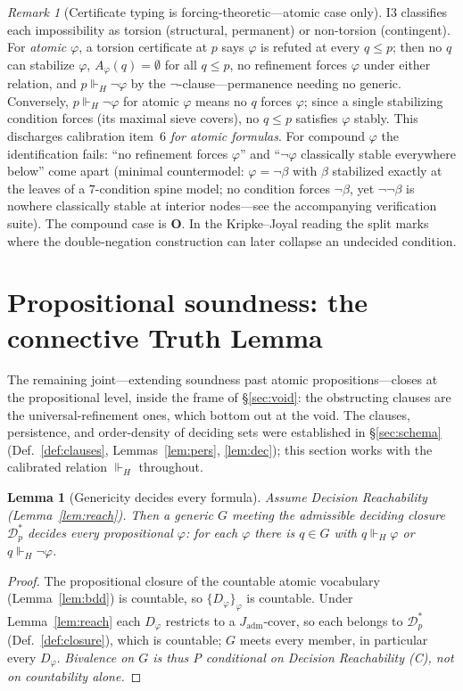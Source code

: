 \documentclass[11pt]{article}
\newtheorem{lemma}{Lemma}
\theoremstyle{definition}
\theoremstyle{remark}
\newtheorem*{remark}{Remark}
\newcommand{\forcesH}{\Vdash_{H}}
\newcommand{\refines}{\leq}
\newcommand{\Jadm}{J_{\mathrm{adm}}}
\begin{document}
\begin{remark}[Certificate typing is forcing-theoretic---atomic case only]\label{rem:torsion}
I3 classifies each impossibility as torsion (structural, permanent) or non-torsion (contingent).
For \emph{atomic} $\varphi$, a torsion certificate at $p$ says $\varphi$ is refuted at every
$q\refines p$; then no $q$ can stabilize $\varphi$, $A_\varphi(q)=\emptyset$ for all $q\refines p$,
no refinement forces $\varphi$ under either relation, and $p\forcesH\neg\varphi$ by the
$\neg$-clause---permanence needing no generic. Conversely, $p\forcesH\neg\varphi$ for atomic
$\varphi$ means no $q$ forces $\varphi$; since a single stabilizing condition forces (its maximal
sieve covers), no $q\refines p$ satisfies $\varphi$ stably. This discharges calibration item~6
\emph{for atomic formulas}. For compound $\varphi$ the identification fails: ``no refinement forces
$\varphi$'' and ``$\neg\varphi$ classically stable everywhere below'' come apart (minimal
countermodel: $\varphi=\neg\beta$ with $\beta$ stabilized exactly at the leaves of a $7$-condition
spine model; no condition forces $\neg\beta$, yet $\neg\neg\beta$ is nowhere classically stable at
interior nodes---see the accompanying verification suite). The compound case is \textbf{O}. In the
Kripke--Joyal reading the split marks where the double-negation construction can later collapse an
undecided condition.
\end{remark}

\section{Propositional soundness: the connective Truth Lemma}\label{sec:atomic}

The remaining joint---extending soundness past atomic propositions---closes at the propositional level,
inside the frame of \S\ref{sec:void}: the obstructing clauses are the universal-refinement ones, which
bottom out at the void. The clauses, persistence, and order-density of deciding sets were established
in \S\ref{sec:schema} (Def.~\ref{def:clauses}, Lemmas~\ref{lem:pers}, \ref{lem:dec}); this section
works with the calibrated relation $\forcesH$ throughout.

\begin{lemma}[Genericity decides every formula]\label{lem:bivalence}
Assume Decision Reachability (Lemma~\ref{lem:reach}). Then a generic $G$ meeting the admissible
deciding closure $\mathcal{D}_p^\ast$ decides every propositional $\varphi$: for each $\varphi$
there is $q\in G$ with $q\forcesH\varphi$ or $q\forcesH\neg\varphi$.
\end{lemma}
\begin{proof}
The propositional closure of the countable atomic vocabulary (Lemma~\ref{lem:bdd}) is countable, so
$\{D_\varphi\}_\varphi$ is countable. Under Lemma~\ref{lem:reach} each $D_\varphi$ restricts to a
$\Jadm$-cover, so each belongs to $\mathcal{D}_p^\ast$ (Def.~\ref{def:closure}), which is countable;
$G$ meets every member, in particular every $D_\varphi$. \emph{Bivalence on $G$ is thus P
conditional on Decision Reachability (C), not on countability alone.}
\end{proof}
\end{document}
